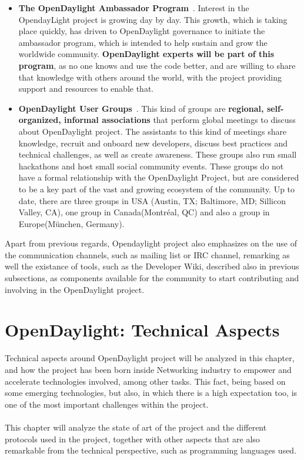 \documentclass[a4paper, 12pt]{book}
\begin{document}
\begin{enumerate}
\begin{itemize}
\item{\textbf{The OpenDaylight Ambassador Program}~\cite{OpenDaylightAmbassadorProgram}}. Interest in the OpendayLight project is growing day by day. This growth, which is taking place quickly, has driven to OpenDaylight governance to initiate the ambassador program, which is intended to help sustain and grow the worldwide community. \textbf{OpenDaylight experts will be part of this program}, as no one knows and use the code better, and are willing to share that knowledge with others around the world, with the project providing support and resources to enable that.
\item{\textbf{OpenDaylight User Groups}~\cite{OpenDaylightUserGroups}}. This kind of groups are \textbf{regional, self-organized, informal associations} that perform global meetings to discuss about OpenDaylight project. The assistants to this kind of meetings share knowledge, recruit and onboard new developers, discuss best practices and technical challenges, as well as create awareness. These groups also run small hackathons and host small social community events. These groups do not have a formal relationship with the OpenDaylight Project, but are considered to be a key part of the vast and growing ecosystem of the community. Up to date, there are three groups in USA (Austin, TX; Baltimore, MD; Sillicon Valley, CA), one group in Canada(Montréal, QC) and also a group in Europe(München, Germany).
\end{itemize}

Apart from previous regards, Opendaylight project also emphasizes on the use of the communication channels, such as mailing list or IRC channel, remarking as well the existance of tools, such as the Developer Wiki, described also in previous subsections, as components available for the community to start contributing and involving in the OpenDaylight project.
\end{enumerate}

\chapter{OpenDaylight: Technical Aspects}
\label{chap:odltechnical}
Technical aspects around OpenDaylight project will be analyzed in this chapter, and how the project has been born inside Networking industry to empower and accelerate technologies involved, among other tasks. This fact, being based on some emerging technologies, but also, in which there is a high expectation too, is one of the most important challenges within the project.\\
\\
This chapter will analyze the state of art of the project and the different protocols used in the project, together with other aspects that are also remarkable from the technical perspective, such as programming languages used.
\end{document}

